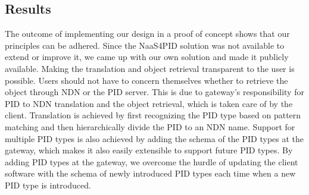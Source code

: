 \subsection{Results}\label{results-pid}
The outcome of implementing our design in a proof of concept shows that our principles can be adhered. Since the NaaS4PID solution was not available to extend or improve it, we came up with our own solution and made it publicly available. Making the translation and object retrieval transparent to the user is possible. Users should not have to concern themselves whether to retrieve the object through NDN or the PID server. This is due to gateway's responsibility for PID to NDN translation and the object retrieval, which is taken care of by the client. 
Translation is achieved by first recognizing the PID type based on pattern matching and then hierarchically divide the PID to an NDN name. Support for multiple PID types is also achieved by adding the schema of the PID types at the gateway, which makes it also easily extensible to support future PID types. By adding PID types at the gateway, we overcome the hurdle of updating the client software with the schema of newly introduced PID types each time when a new PID type is introduced.






